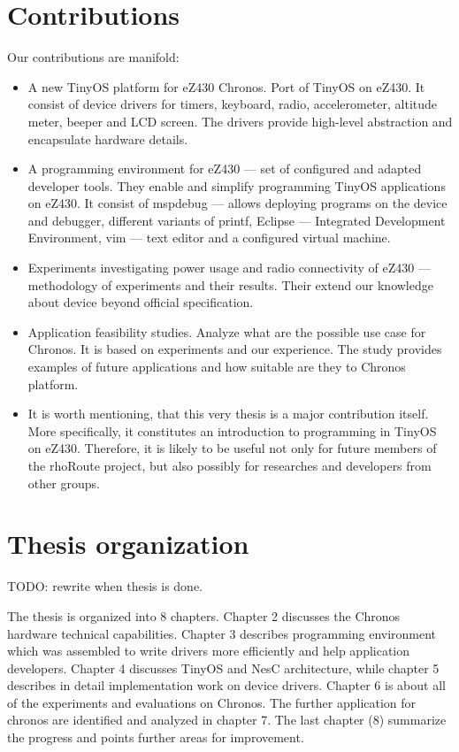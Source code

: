 \section{Contributions}
Our contributions are manifold:
\begin{itemize}
  \item A new TinyOS platform for eZ430 Chronos. Port of TinyOS on eZ430. It consist of device drivers for timers, keyboard, radio, accelerometer, altitude meter, beeper and LCD screen.
The drivers provide high-level abstraction and encapsulate hardware details.
  \item A programming environment for eZ430 --- set of configured and adapted developer tools. They enable and simplify programming TinyOS applications on eZ430. It consist of mspdebug --- allows deploying programs on the device and debugger, different variants of printf, Eclipse --- Integrated Development Environment, vim --- text editor and a configured virtual machine.
  \item Experiments investigating power usage and radio connectivity of eZ430 --- methodology of experiments and their results. Their extend our knowledge about device beyond official specification.
  \item Application feasibility studies. Analyze what are the possible use case for Chronos. It is based on experiments and our experience. The study provides examples of future applications and how suitable are they to Chronos platform.
  \item It is worth mentioning, that this very thesis is a major contribution itself. More specifically, it constitutes an introduction to programming in TinyOS on eZ430. Therefore, it is likely to be useful not only for future members of the rhoRoute project, but also possibly for researches and developers from other groups.
\end{itemize}

\section{Thesis organization}
TODO: rewrite when thesis is done.

The thesis is organized into 8 chapters. Chapter 2 discusses the Chronos hardware technical capabilities. Chapter 3 describes programming environment which was assembled to write drivers more efficiently and help application developers. Chapter 4 discusses TinyOS and NesC architecture, while chapter 5 describes in detail implementation work on device drivers. Chapter 6 is about all of the experiments and evaluations on Chronos. The further application for chronos are identified and analyzed in chapter 7. The last chapter (8) summarize the progress and points further areas for improvement.
